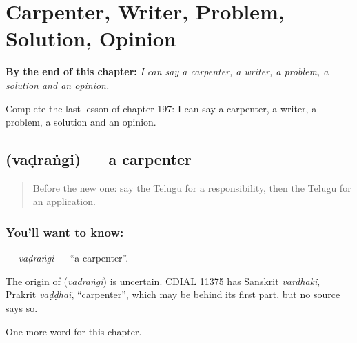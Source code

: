 
\chapter{Carpenter, Writer, Problem, Solution, Opinion}
\label{ch:te-carpenter-writer-problem-solution-opinion}

\begin{chapteropening}
\textbf{By the end of this chapter:} \emph{I can say a carpenter, a writer, a problem, a solution and an opinion.}

Complete the last lesson of chapter 197: I can say a carpenter, a writer, a problem, a solution and an opinion.
\end{chapteropening}

\section[\texorpdfstring{\te{వడ్రంగి} (vaḍraṅgi)}{వడ్రంగి (vaḍraṅgi)}]{ (vaḍraṅgi) — a carpenter}

\label{lesson:TE-C197-vadrangi}



\begin{quote}
Before the new one: say the Telugu for a responsibility, then the Telugu for an application.
\end{quote}

\subsection*{You'll want to know: }
\textbf{} — \emph{vaḍraṅgi} — \textquotedblleft{}a carpenter\textquotedblright{}.

\begin{cousinweb}
The origin of \textbf{} (\emph{vaḍraṅgi}) is uncertain. CDIAL 11375 has Sanskrit \emph{vardhaki}, Prakrit \emph{vaḍḍhaï}, \textquotedblleft{}carpenter\textquotedblright{}, which may be behind its first part, but no source says so.
\end{cousinweb}

\begin{grammarlens}[title={What you've built}]
One more word for this chapter.
\end{grammarlens}

